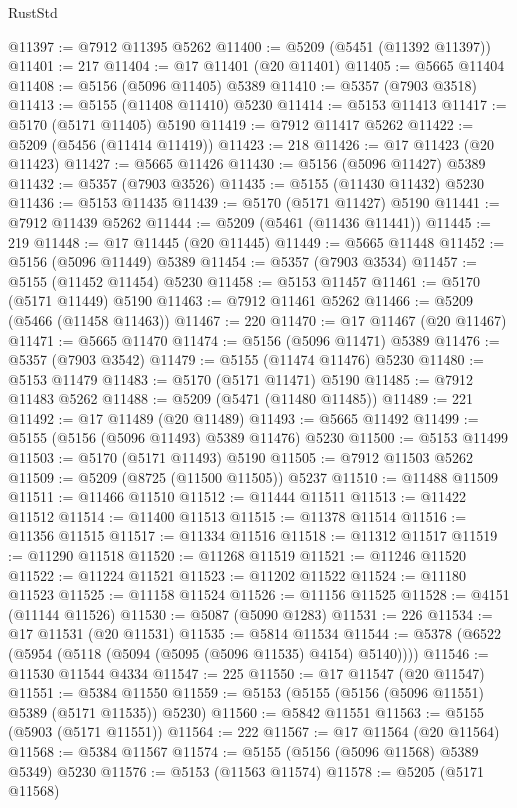 \begin{lexlean}{RustStd}
\begin{coremodule}
@11397 := @7912 @11395 @5262
@11400 := @5209 (@5451 (@11392 @11397))
@11401 := 217
@11404 := @17 @11401 (@20 @11401)
@11405 := @5665 @11404
@11408 := @5156 (@5096 @11405) @5389
@11410 := @5357 (@7903 @3518)
@11413 := @5155 (@11408 @11410) @5230
@11414 := @5153 @11413
@11417 := @5170 (@5171 @11405) @5190
@11419 := @7912 @11417 @5262
@11422 := @5209 (@5456 (@11414 @11419))
@11423 := 218
@11426 := @17 @11423 (@20 @11423)
@11427 := @5665 @11426
@11430 := @5156 (@5096 @11427) @5389
@11432 := @5357 (@7903 @3526)
@11435 := @5155 (@11430 @11432) @5230
@11436 := @5153 @11435
@11439 := @5170 (@5171 @11427) @5190
@11441 := @7912 @11439 @5262
@11444 := @5209 (@5461 (@11436 @11441))
@11445 := 219
@11448 := @17 @11445 (@20 @11445)
@11449 := @5665 @11448
@11452 := @5156 (@5096 @11449) @5389
@11454 := @5357 (@7903 @3534)
@11457 := @5155 (@11452 @11454) @5230
@11458 := @5153 @11457
@11461 := @5170 (@5171 @11449) @5190
@11463 := @7912 @11461 @5262
@11466 := @5209 (@5466 (@11458 @11463))
@11467 := 220
@11470 := @17 @11467 (@20 @11467)
@11471 := @5665 @11470
@11474 := @5156 (@5096 @11471) @5389
@11476 := @5357 (@7903 @3542)
@11479 := @5155 (@11474 @11476) @5230
@11480 := @5153 @11479
@11483 := @5170 (@5171 @11471) @5190
@11485 := @7912 @11483 @5262
@11488 := @5209 (@5471 (@11480 @11485))
@11489 := 221
@11492 := @17 @11489 (@20 @11489)
@11493 := @5665 @11492
@11499 := @5155 (@5156 (@5096 @11493) @5389 @11476) @5230
@11500 := @5153 @11499
@11503 := @5170 (@5171 @11493) @5190
@11505 := @7912 @11503 @5262
@11509 := @5209 (@8725 (@11500 @11505)) @5237
@11510 := @11488 @11509
@11511 := @11466 @11510
@11512 := @11444 @11511
@11513 := @11422 @11512
@11514 := @11400 @11513
@11515 := @11378 @11514
@11516 := @11356 @11515
@11517 := @11334 @11516
@11518 := @11312 @11517
@11519 := @11290 @11518
@11520 := @11268 @11519
@11521 := @11246 @11520
@11522 := @11224 @11521
@11523 := @11202 @11522
@11524 := @11180 @11523
@11525 := @11158 @11524
@11526 := @11156 @11525
@11528 := @4151 (@11144 @11526)
@11530 := @5087 (@5090 @1283)
@11531 := 226
@11534 := @17 @11531 (@20 @11531)
@11535 := @5814 @11534
@11544 := @5378 (@6522 (@5954 (@5118 (@5094 (@5095 (@5096 @11535) @4154) @5140))))
@11546 := @11530 @11544 @4334
@11547 := 225
@11550 := @17 @11547 (@20 @11547)
@11551 := @5384 @11550
@11559 := @5153 (@5155 (@5156 (@5096 @11551) @5389 (@5171 @11535)) @5230)
@11560 := @5842 @11551
@11563 := @5155 (@5903 (@5171 @11551))
@11564 := 222
@11567 := @17 @11564 (@20 @11564)
@11568 := @5384 @11567
@11574 := @5155 (@5156 (@5096 @11568) @5389 @5349) @5230
@11576 := @5153 (@11563 @11574)
@11578 := @5205 (@5171 @11568)

\end{coremodule}
\end{lexlean}
